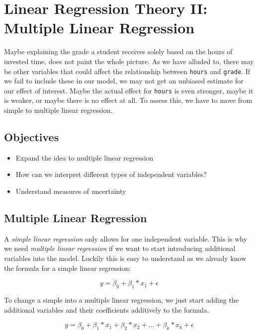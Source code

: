 \documentclass[
]{book}
\providecommand{\tightlist}{%
  \setlength{\itemsep}{0pt}\setlength{\parskip}{0pt}}
\begin{document}
\hypertarget{lin-t-2}{%
\chapter{Linear Regression Theory II: Multiple Linear Regression}\label{lin-t-2}}

Maybe explaining the grade a student receives solely based on the hours of
invested time, does not paint the whole picture. As we have alluded to, there
may be other variables that could affect the relationship between \texttt{hours} and
\texttt{grade}.
If we fail to include these in our model, we may not get an unbiased estimate
for our effect of interest. Maybe the actual effect for \texttt{hours} is even stronger,
maybe it is weaker, or maybe there is no effect at all.
To assess this, we have to move from simple to multiple linear regression.

\hypertarget{objectives-4}{%
\section{Objectives}\label{objectives-4}}

\begin{itemize}
\tightlist
\item
  Expand the idea to multiple linear regression
\item
  How can we interpret different types of independent variables?
\item
  Understand measures of uncertainty
\end{itemize}

\hypertarget{multiple-linear-regression}{%
\section{Multiple Linear Regression}\label{multiple-linear-regression}}

A \emph{simple linear regression} only allows for one independent variable. This is
why we need \emph{multiple linear regression} if we want to start introducing
additional variables into the model. Luckily this is easy to understand as we
already know the formula for a simple linear regression:

\[y = \beta_0 + \beta_1*x_1 + \epsilon\]

To change a simple into a multiple linear regression, we just start adding the
additional variables and their coefficients additively to the formula.

\[y = \beta_0 + \beta_1*x_1 + \beta_2*x_2 + ... + \beta_k*x_k + \epsilon\]
\end{document}
